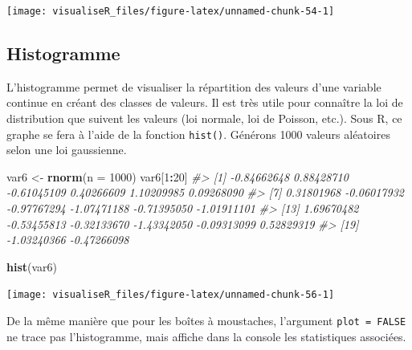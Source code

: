 \documentclass[]{article}
\newenvironment{Shaded}{\begin{snugshade}}{\end{snugshade}}
\newcommand{\CommentTok}[1]{\textcolor[rgb]{0.56,0.35,0.01}{\textit{#1}}}
\newcommand{\DataTypeTok}[1]{\textcolor[rgb]{0.13,0.29,0.53}{#1}}
\newcommand{\DecValTok}[1]{\textcolor[rgb]{0.00,0.00,0.81}{#1}}
\newcommand{\KeywordTok}[1]{\textcolor[rgb]{0.13,0.29,0.53}{\textbf{#1}}}
\newcommand{\NormalTok}[1]{#1}
\newcommand{\OperatorTok}[1]{\textcolor[rgb]{0.81,0.36,0.00}{\textbf{#1}}}
\newcommand{\OtherTok}[1]{\textcolor[rgb]{0.56,0.35,0.01}{#1}}
\newcommand{\StringTok}[1]{\textcolor[rgb]{0.31,0.60,0.02}{#1}}
\begin{document}
\begin{center}\texttt{[image: visualiseR\_files/figure-latex/unnamed-chunk-54-1]} \end{center}

\hypertarget{histogramme}{%
\subsection{Histogramme}\label{histogramme}}

L'histogramme permet de visualiser la répartition des valeurs d'une variable continue en créant des classes de valeurs. Il est très utile pour connaître la loi
de distribution que suivent les valeurs (loi normale, loi de Poisson, etc.). Sous R, ce graphe se fera à l'aide de la fonction \texttt{hist()}.
Générons 1000 valeurs aléatoires selon une loi gaussienne.

\begin{Shaded}
\begin{Highlighting}[]
\NormalTok{var6 <-}\StringTok{ }\KeywordTok{rnorm}\NormalTok{(}\DataTypeTok{n =} \DecValTok{1000}\NormalTok{)}
\NormalTok{var6[}\DecValTok{1}\OperatorTok{:}\DecValTok{20}\NormalTok{]}
\CommentTok{#>  [1] -0.84662648  0.88428710 -0.61045109  0.40266609  1.10209985  0.09268090}
\CommentTok{#>  [7]  0.31801968 -0.06017932 -0.97767294 -1.07471188 -0.71395050 -1.01911101}
\CommentTok{#> [13]  1.69670482 -0.53455813 -0.32133670 -1.43342050 -0.09313099  0.52829319}
\CommentTok{#> [19] -1.03240366 -0.47266098}
\end{Highlighting}
\end{Shaded}

\begin{Shaded}
\begin{Highlighting}[]
\KeywordTok{hist}\NormalTok{(var6)}
\end{Highlighting}
\end{Shaded}

\begin{center}\texttt{[image: visualiseR\_files/figure-latex/unnamed-chunk-56-1]} \end{center}

De la même manière que pour les boîtes à moustaches, l'argument \texttt{plot\ =\ FALSE} ne trace pas l'histogramme, mais affiche dans la console les statistiques associées.

\begin{Shaded}
\end{Shaded}
\end{document}
